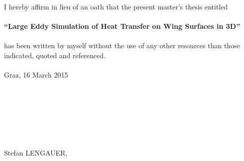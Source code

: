 
I hereby affirm in lieu of an oath that the present master’s thesis entitled\\
\\
\textbf{``Large Eddy Simulation of Heat Transfer on Wing Surfaces in 3D''}\\
\\
has been written by myself without the use of any other resources than those indicated, quoted and referenced.\\
\\
Graz, 16 March 2015\\
\\
\\
\\
\\
\\
\\
\\
Stefan LENGAUER,
